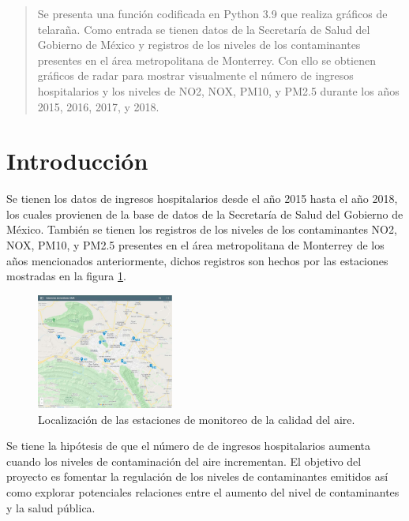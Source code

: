 \documentclass[a0]{sciposter} %
\begin{document}
\begin{multicols}{2} 

\begin{abstract}
Se presenta una función codificada en Python 3.9 \citep{python} que realiza gráficos de telaraña. Como entrada se tienen datos de la Secretaría de Salud del Gobierno de México y registros de los niveles de los contaminantes presentes en el área metropolitana de Monterrey. Con ello se obtienen gráficos de radar para mostrar visualmente el número de ingresos hospitalarios y los niveles de NO2, NOX, PM10, y PM2.5 durante los años 2015, 2016, 2017, y 2018.
\end{abstract}

\section{Introducción}
Se tienen los datos de ingresos hospitalarios desde el año 2015 hasta el año 2018, los cuales provienen de la base de datos de la Secretaría de Salud del Gobierno de México. También se tienen los registros de los niveles de los contaminantes NO2, NOX, PM10, y PM2.5 presentes en el área metropolitana de Monterrey de los años mencionados anteriormente, dichos registros son hechos por las estaciones mostradas en la figura \ref{estaciones}.
\begin{figure}
\setcounter{figure}{0} %
\captionsetup{type=figure} %
\begin{center}
   \includegraphics[width=0.4\textwidth]{mapa_estaciones.eps}
   \end{center}
    \caption{Localización de las estaciones de monitoreo de la calidad del aire.}
    \label{estaciones}
\end{figure}

Se tiene la hipótesis de que el número de de ingresos hospitalarios aumenta cuando los niveles de contaminación del aire incrementan. El objetivo del proyecto es fomentar la regulación de los niveles de contaminantes emitidos así como explorar potenciales relaciones entre el aumento del nivel de contaminantes y la salud pública.


\end{multicols}
\end{document}
